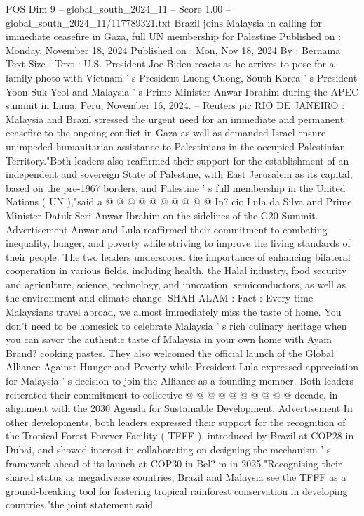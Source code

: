 \begin{textsample}{POS Dim 9 – global\_south\_2024\_11 – Score 1.00 – global\_south\_2024\_11/117789321.txt}  \label{ex:f9_pos_034}
Brazil joins Malaysia in calling for immediate ceasefire in Gaza, full UN membership for Palestine Published on : Monday, November 18, 2024 Published on : Mon, Nov 18, 2024 By : Bernama Text Size : Text : U.S.
President Joe Biden reacts as he arrives to pose for a family photo with Vietnam ' s President Luong Cuong, South Korea ' s President Yoon Suk Yeol and Malaysia ' s Prime Minister Anwar Ibrahim during the APEC summit in Lima, Peru, November 16, 2024. -- Reuters pic RIO DE JANEIRO : Malaysia and Brazil stressed the urgent need for an immediate and permanent ceasefire to the ongoing conflict in Gaza as well as demanded Israel ensure unimpeded humanitarian assistance to Palestinians in the occupied Palestinian Territory."Both leaders also reaffirmed their support for the establishment of an independent and sovereign State of Palestine, with East Jerusalem as its capital, based on the pre-1967 borders, and Palestine ' s full membership in the United Nations ( UN ),"said a @ @ @ @ @ @ @ @ @ @ In? cio Lula da Silva and Prime Minister Datuk Seri Anwar Ibrahim on the sidelines of the G20 Summit.
Advertisement Anwar and Lula reaffirmed their commitment to combating inequality, hunger, and poverty while striving to improve the living standards of their people.
The two leaders underscored the importance of enhancing bilateral cooperation in various fields, including health, the Halal industry, food security and agriculture, science, technology, and innovation, semiconductors, as well as the environment and climate change.
SHAH ALAM : Fact : Every time Malaysians travel abroad, we almost immediately miss the taste of home.
You don't need to be homesick to celebrate Malaysia ' s rich culinary heritage when you can savor the authentic taste of Malaysia in your own home with Ayam Brand? cooking pastes.
They also welcomed the official launch of the Global Alliance Against Hunger and Poverty while President Lula expressed appreciation for Malaysia ' s decision to join the Alliance as a founding member.
Both leaders reiterated their commitment to collective @ @ @ @ @ @ @ @ @ @ decade, in alignment with the 2030 Agenda for Sustainable Development.
Advertisement In other developments, both leaders expressed their support for the recognition of the Tropical Forest Forever Facility ( TFFF ), introduced by Brazil at COP28 in Dubai, and showed interest in collaborating on designing the mechanism ' s framework ahead of its launch at COP30 in Bel? m in 2025."Recognising their shared status as megadiverse countries, Brazil and Malaysia see the TFFF as a ground-breaking tool for fostering tropical rainforest conservation in developing countries,"the joint statement said.

\end{textsample}
